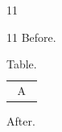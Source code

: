 \documentclass[paper=A4]{ropas-poster}
\begin{document}
\begin{postergrid}{1}{1}
\begin{posterblock}{1}{1}
Before.\par\begin{table}[H]\begin{tabular}{c}A\end{tabular}\caption{Table.}\end{table}\par After.
\end{posterblock}
\end{postergrid}
\end{document}
